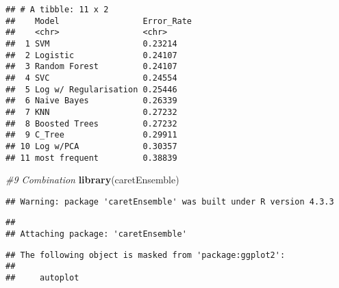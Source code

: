 \documentclass[
]{article}
\newenvironment{Shaded}{\begin{snugshade}}{\end{snugshade}}
\newcommand{\CommentTok}[1]{\textcolor[rgb]{0.56,0.35,0.01}{\textit{#1}}}
\newcommand{\FunctionTok}[1]{\textcolor[rgb]{0.13,0.29,0.53}{\textbf{#1}}}
\newcommand{\NormalTok}[1]{#1}
\begin{document}
\begin{verbatim}
## # A tibble: 11 x 2
##    Model                 Error_Rate
##    <chr>                 <chr>     
##  1 SVM                   0.23214   
##  2 Logistic              0.24107   
##  3 Random Forest         0.24107   
##  4 SVC                   0.24554   
##  5 Log w/ Regularisation 0.25446   
##  6 Naive Bayes           0.26339   
##  7 KNN                   0.27232   
##  8 Boosted Trees         0.27232   
##  9 C_Tree                0.29911   
## 10 Log w/PCA             0.30357   
## 11 most frequent         0.38839
\end{verbatim}

\begin{Shaded}
\begin{Highlighting}[]
\CommentTok{\#9 Combination}
\FunctionTok{library}\NormalTok{(caretEnsemble)}
\end{Highlighting}
\end{Shaded}

\begin{verbatim}
## Warning: package 'caretEnsemble' was built under R version 4.3.3
\end{verbatim}

\begin{verbatim}
## 
## Attaching package: 'caretEnsemble'
\end{verbatim}

\begin{verbatim}
## The following object is masked from 'package:ggplot2':
## 
##     autoplot
\end{verbatim}
\end{document}
